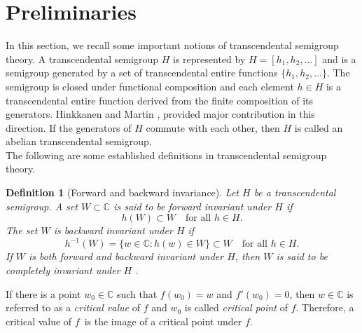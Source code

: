 \documentclass[a4paper,12pt]{amsart}
\numberwithin{equation}{section}
\newtheorem{definition}[theorem]{Definition}
\begin{document}
	\section{Preliminaries} \label{sec 2}
	In this section, we recall some important notions of transcendental semigroup theory. A transcendental semigroup $H$ is represented by $H=[h_1, h_2, \dots ]$ and is a semigroup generated by a set of transcendental entire functions $\{h_1,h_2,\dots\}$. The semigroup is closed under functional composition and each element $h \in H$ is a transcendental entire function derived from the finite composition of its generators. 
	Hinkkanen and Martin \cite{hinkkanen1996dynamics}, provided major contribution in this direction. If the generators of $H$ commute with each other, then $H$ is called an abelian
	transcendental semigroup.\\
	The following are some established definitions in transcendental semigroup theory.
	
	
	\begin{definition}[Forward and backward invariance]
		Let $H$ be a transcendental semigroup. A set $W \subset \mathbb{C}$ is
		said to be \emph{forward invariant} under $H$ if
		\[
		h(W) \subset W \quad \text{for all } h \in H.
		\]
		The set $W$ is  \emph{backward invariant} under $H$ if
		\[
		h^{-1}(W)=\{ w \in \mathbb{C} : h(w) \in W \} \subset W
		\quad \text{for all } h \in H.
		\]
		If $W$ is both forward and backward invariant under $H$, then $W$ is
		said to be \emph{completely invariant} under $H$ \cite{kumar2016dynamics}.
	\end{definition}
	
	If there is a point $w_0 \in \mathbb{C}$ such that $f(w_0)=w$ and $f'(w_0)=0$, then $w \in \mathbb{C}$ is referred to as a \emph{critical value} of $f$ and $w_0$ is called  \emph{critical point} of $f$. Therefore, a critical value of $f$ is the image of a critical point under $f$.
	
\end{document}
